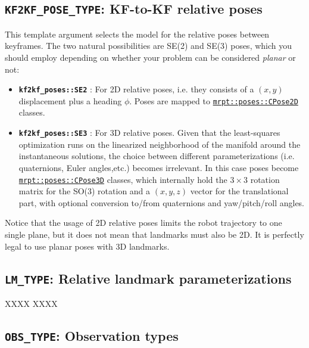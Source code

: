 \documentclass[a4paper,11pt]{article}
\begin{document}
\subsection{\texttt{KF2KF\_POSE\_TYPE}: KF-to-KF relative poses}
\label{sec:k2k_types}

This template argument selects the model for the relative poses between keyframes. 
The two natural possibilities are SE(2) and SE(3) poses, which you should employ 
depending on whether your problem can be considered \emph{planar} or not:

\begin{itemize}
\item{\textbf{ \texttt{kf2kf\_poses::SE2} }: For 2D relative poses, i.e. they consists of a $(x,y)$ displacement 
plus a heading $\phi$. Poses are mapped to 
\href{http://reference.mrpt.org/stable/classmrpt_1_1poses_1_1_c_pose2_d.html}
{\texttt{mrpt::poses::CPose2D}} classes. 
}
\item{\textbf{ \texttt{kf2kf\_poses::SE3} }: For 3D relative poses. Given that the least-squares optimization runs 
on the linearized neighborhood of the manifold \cite{blanco2010tutorial} around the instantaneous solutions, the 
choice between different parameterizations (i.e. quaternions, Euler angles,etc.) becomes irrelevant. 
In this case poses become 
\href{http://reference.mrpt.org/stable/classmrpt_1_1poses_1_1_c_pose3_d.html}
{\texttt{mrpt::poses::CPose3D}}
classes, which internally hold the $3 \times 3$ rotation matrix for the SO(3) rotation and a $(x,y,z)$ vector 
for the translational part, with optional conversion to/from quaternions and yaw/pitch/roll angles.
}
\end{itemize}

Notice that the usage of 2D relative poses limits the robot trajectory to one single plane, but 
it does not mean that landmarks must also be 2D. It is perfectly legal to use planar poses with 3D landmarks.


\subsection{\texttt{LM\_TYPE}: Relative landmark parameterizations}
\label{sec:k2f_types}

XXXX XXXX 

\subsection{\texttt{OBS\_TYPE}: Observation types}
\end{document}

